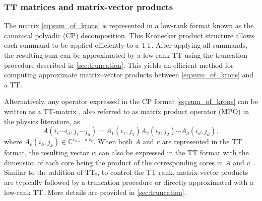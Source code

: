 \documentclass[10pt,preprint]{elsarticle}
\begin{document}
\subsubsection{TT matrices and matrix-vector products} 

The matrix \eqref{eq:sum_of_krons} is represented in a low-rank format known as the canonical polyadic (CP) decomposition. This Kronecker product structure allows each summand to be applied efficiently to a TT. After applying all summands, the resulting sum can be approximated by a low-rank TT using the truncation procedure described in \cref{sec:truncation}. This yields an efficient method for computing approximate matrix–vector products between \eqref{eq:sum_of_krons} and a TT. 

Alternatively, any operator expressed in the CP format \eqref{eq:sum_of_krons} can be written as a TT-matrix \cite[Section 2.3]{kressner2014}, also referred to as matrix product operator (MPO) in the physics literature, as 
\begin{equation} \label{eq:tt_matrix}
    A(i_1 \cdots i_d, j_1 \cdots j_d) = 
    A_1(i_1,j_1) A_2(i_2,j_2) \cdots A_d(i_d,j_d), 
\end{equation}
where $A_k(i_k,j_k) \in \mathbb{C}^{r_{k-1} \times r_k}$. 
When both \( A \) and \( v \) are represented in the TT format, the resulting vector \( w \) can also be expressed in the TT format with the dimension of each core being the product of the corresponding cores in $A$ and $v$~\cite[Section 4.3]{oseledets2011tensor}.
Similar to the addition of TTs, to control the TT rank, matrix-vector products are typically followed by a truncation procedure or directly approximated with a low-rank TT. More details are provided in \cref{sec:truncation}. 
\end{document}
